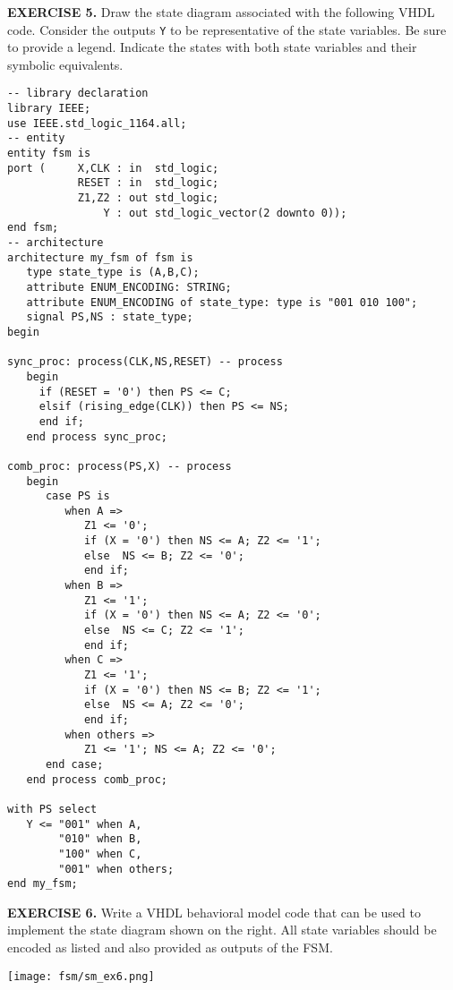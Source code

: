 \vspace{20pt}
\noindent
\begin{minipage}{1\textwidth}
\textbf{EXERCISE 5.}
Draw the state diagram associated with the following VHDL code. Consider the outputs \texttt{Y} to be representative of the state variables. Be sure to provide a legend. Indicate the states with both state variables and their symbolic equivalents.
\end{minipage}
\begin{minipage}{1\textwidth}
\vspace{10px}
\begin{lstlisting}
-- library declaration
library IEEE;
use IEEE.std_logic_1164.all;
-- entity
entity fsm is 
port (     X,CLK : in  std_logic; 
           RESET : in  std_logic; 
           Z1,Z2 : out std_logic;  
               Y : out std_logic_vector(2 downto 0)); 
end fsm;
-- architecture
architecture my_fsm of fsm is
   type state_type is (A,B,C);
   attribute ENUM_ENCODING: STRING; 
   attribute ENUM_ENCODING of state_type: type is "001 010 100";
   signal PS,NS : state_type;
begin

sync_proc: process(CLK,NS,RESET) -- process
   begin
     if (RESET = '0') then PS <= C; 
     elsif (rising_edge(CLK)) then PS <= NS; 
     end if; 
   end process sync_proc; 

comb_proc: process(PS,X) -- process
   begin
      case PS is 
         when A =>    
            Z1 <= '0';  
            if (X = '0') then NS <= A; Z2 <= '1';   
            else  NS <= B; Z2 <= '0';
            end if; 
         when B =>    
            Z1 <= '1';  
            if (X = '0') then NS <= A; Z2 <= '0';  
            else  NS <= C; Z2 <= '1'; 
            end if; 
         when C =>    
            Z1 <= '1';  
            if (X = '0') then NS <= B; Z2 <= '1'; 
            else  NS <= A; Z2 <= '0'; 
            end if; 
         when others =>    
            Z1 <= '1'; NS <= A; Z2 <= '0';  
      end case; 
   end process comb_proc; 
 
with PS select
   Y <= "001" when A, 
        "010" when B, 
        "100" when C, 
        "001" when others; 
end my_fsm;
\end{lstlisting}
\end{minipage}

\vspace{20pt}
\noindent
\begin{minipage}[t]{0.5\textwidth}
	\textbf{EXERCISE 6.}
	Write a VHDL behavioral model code that can be used to implement the state diagram shown on the right. All state variables should be encoded as listed and also provided as outputs of the FSM.
\end{minipage}
\begin{minipage}[t]{0.49\textwidth}
	\vspace{0pt}\raggedright
	\centering
	\texttt{[image: fsm/sm\_ex6.png]}
\end{minipage}


